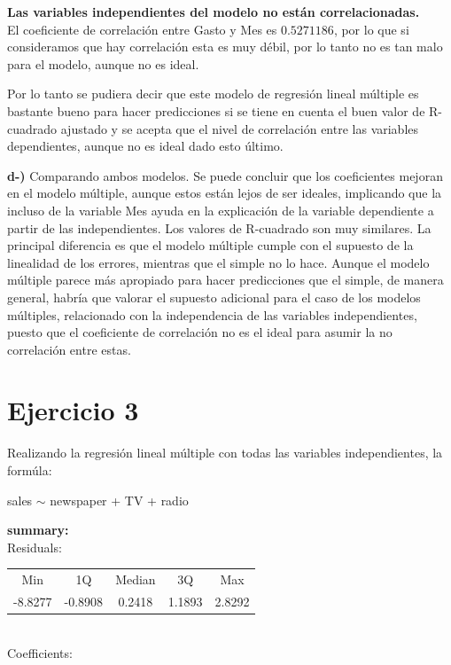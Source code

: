 \documentclass[12pt,a4paper]{article}
\begin{document}
	\textbf{Las variables independientes del modelo no están correlacionadas.}\\
	El coeficiente de correlación entre Gasto y Mes es $0.5271186$, por lo que si consideramos que hay correlación esta es muy débil, por lo tanto no es tan malo para el modelo, aunque no es ideal.
	
	Por lo tanto se pudiera decir que este modelo de regresión lineal múltiple es bastante bueno para hacer predicciones si se tiene en cuenta el buen valor de R-cuadrado ajustado y se acepta que el nivel de correlación entre las variables dependientes, aunque no es ideal dado esto último.
	
	 \textbf{d-)} Comparando ambos modelos. Se puede concluir que los coeficientes mejoran en el modelo múltiple, aunque estos están lejos de ser ideales, implicando que la incluso de la variable Mes ayuda en la explicación de la variable dependiente a partir de las independientes. Los valores de R-cuadrado son muy similares. La principal diferencia es que el modelo múltiple cumple con el supuesto de la linealidad de los errores, mientras que el simple no lo hace. Aunque el modelo múltiple parece más apropiado para hacer predicciones que el simple, de manera general, habría que valorar el supuesto adicional para el caso de los modelos múltiples, relacionado con la independencia de las variables independientes, puesto que el coeficiente de correlación no es el ideal para asumir la no correlación entre estas.   
	
	\section{Ejercicio 3}
	Realizando la regresión lineal múltiple con todas las variables independientes,
	la formúla:
	\begin{center}
		sales $\sim$ newspaper + TV + radio 
	\end{center}
	
	{\bf summary: }\\
	
	Residuals:\\
	
	\begin{tabular}{ccccc}
		Min&     1Q& Median& 3Q&    Max\\
		-8.8277& -0.8908&  0.2418&  1.1893&  2.8292 
	\end{tabular}\\ 
	
	Coefficients:\\
	
\end{document}
